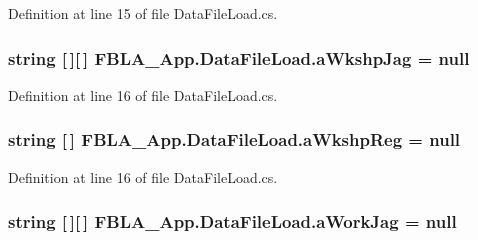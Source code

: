Definition at line 15 of file Data\+File\+Load.\+cs.

\hypertarget{class_f_b_l_a___app_1_1_data_file_load_a0c23e07eaf9d664a1b3e5e165b7cd091}{
\subsubsection[{a\+Wkshp\+Jag}]{\setlength{\rightskip}{0pt plus 5cm}string \mbox{[}$\,$\mbox{]}\mbox{[}$\,$\mbox{]} F\+B\+L\+A\+\_\+\+App.\+Data\+File\+Load.\+a\+Wkshp\+Jag = null}}\label{class_f_b_l_a___app_1_1_data_file_load_a0c23e07eaf9d664a1b3e5e165b7cd091}


Definition at line 16 of file Data\+File\+Load.\+cs.

\hypertarget{class_f_b_l_a___app_1_1_data_file_load_a423217633c64b23df4ec33983408612c}{
\subsubsection[{a\+Wkshp\+Reg}]{\setlength{\rightskip}{0pt plus 5cm}string \mbox{[}$\,$\mbox{]} F\+B\+L\+A\+\_\+\+App.\+Data\+File\+Load.\+a\+Wkshp\+Reg = null}}\label{class_f_b_l_a___app_1_1_data_file_load_a423217633c64b23df4ec33983408612c}


Definition at line 16 of file Data\+File\+Load.\+cs.

\hypertarget{class_f_b_l_a___app_1_1_data_file_load_ad0355396f35a5d055193bfcbde5afc79}{
\subsubsection[{a\+Work\+Jag}]{\setlength{\rightskip}{0pt plus 5cm}string \mbox{[}$\,$\mbox{]}\mbox{[}$\,$\mbox{]} F\+B\+L\+A\+\_\+\+App.\+Data\+File\+Load.\+a\+Work\+Jag = null}}\label{class_f_b_l_a___app_1_1_data_file_load_ad0355396f35a5d055193bfcbde5afc79}


